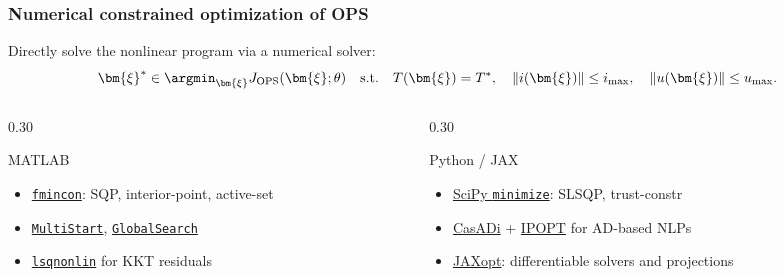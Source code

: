 \begin{frame}
    \frametitle{Numerical constrained optimization of OPS}
    Directly solve the nonlinear program via a numerical solver:
    \[
        \bm{\xi}^* \in \argmin_{\bm{\xi}} J_{\mathrm{OPS}}(\bm{\xi};\theta)
        \quad\text{s.t.}\quad
        T(\bm{\xi})=T^*,\quad \|i(\bm{\xi})\|\le i_{\max},\quad \|u(\bm{\xi})\|\le u_{\max}.
    \]\pause%
    \begin{columns}[T,totalwidth=0.98\textwidth]
        \begin{column}{0.30\textwidth}
            \begin{block}{MATLAB}
                \begin{minipage}[t][0.39\textheight][t]{\linewidth}
                    \begin{itemize}
                        \item \href{https://www.mathworks.com/help/optim/ug/fmincon.html}{\texttt{fmincon}}: SQP, interior-point, active-set
                        \item \href{https://www.mathworks.com/help/gads/multistart.html}{\texttt{MultiStart}}, \href{https://www.mathworks.com/help/gads/globalsearch.html}{\texttt{GlobalSearch}}
                        \item \href{https://www.mathworks.com/help/optim/ug/lsqnonlin.html}{\texttt{lsqnonlin}} for KKT residuals
                    \end{itemize}
                \end{minipage}
            \end{block}
        \end{column}\pause%
        \begin{column}{0.30\textwidth}
            \begin{block}{Python / JAX}
                \begin{minipage}[t][0.39\textheight][t]{\linewidth}
                    \begin{itemize}
                        \item \href{https://docs.scipy.org/doc/scipy/reference/generated/scipy.optimize.minimize.html}{SciPy \texttt{minimize}}: SLSQP, trust-constr
                        \item \href{https://web.casadi.org/docs/}{CasADi} + \href{https://coin-or.github.io/Ipopt/}{IPOPT} for AD-based NLPs
                        \item \href{https://jaxopt.github.io/}{JAXopt}: differentiable solvers and projections

\end{itemize}
\end{minipage}
\end{block}
\end{column}
\end{columns}
\end{frame}
